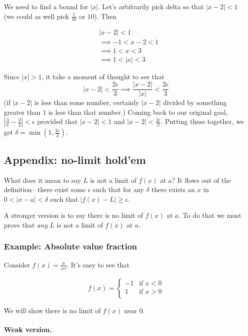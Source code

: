 We need to find a bound for $|x|$. Let's arbitrarily pick delta so
that $|x-2|<1$ (we could as well pick $\frac{1}{10}$ or $10$). Then

\begin{align*}
    &|x-2|<1\\
    &\implies -1<x-2<1\\
    &\implies 1<x<3\\
    &\implies 1<|x|<3
\end{align*}

Since $|x|>1$, it take a moment of thought to see that
\[|x-2|<\frac{2\epsilon}{3}\implies\frac{|x-2|}{|x|}<\frac{2\epsilon}{3}\]
(if $|x-2|$ is less than some number, certainly $|x-2|$ divided by something greater than $1$ is less than that number.) Coming back to our original goal, $|\frac{3}{x}-\frac{3}{2}|<\epsilon$ provided that $|x-2|<1$ and $|x-2|<\frac{2\epsilon}{3}$. Putting these together, we get $\delta=\min(1, \frac{2\epsilon}{3})$.

\subsection{Appendix: no-limit hold'em}

What does it mean to say $L$ is not a limit of $f(x)$ at $a$? It flows
out of the definition-- there exist some $\epsilon$ such that for any
$\delta$ there exists an $x$ in $0<|x-a|<\delta$ such that $|f(x)-L|\geq\epsilon$.

\vs

A stronger version is to say there is no limit of $f(x)$ at $a$. To do
that we must prove that \textit{any} $L$ is not a limit of $f(x)$ at
$a$.

\subsubsection{Example: Absolute value fraction}

Consider $f(x)=\frac{x}{|x|}$. It's easy to see that

\[f(x)=\begin{cases}
    -1 & \text{if } x<0\\
    1 & \text{if } x>0\\
\end{cases}\]

We will show there is no limit of $f(x)$ near $0$.

\paragraph{Weak version.}

